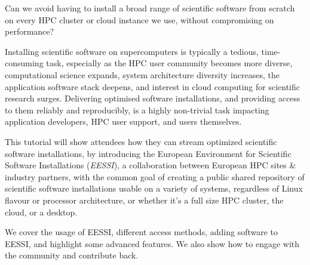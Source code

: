 Can we avoid having to install a broad range of scientific software from scratch on every HPC cluster or
cloud instance we use, without compromising on performance?

Installing scientific software on supercomputers is typically a tedious, time-consuming task, especially as the
HPC user community becomes more diverse, computational science expands, system architecture diversity increases, the
application software stack deepens, and interest in cloud computing for scientific research surges.
Delivering optimised software installations, and providing access to them reliably and reproducibly,
is a highly non-trivial task impacting application developers, HPC user support, and users themselves.

This tutorial will show attendees how they can stream optimized scientific software installations,
by introducing the European Environment for Scientific Software Installations (\emph{EESSI}), a collaboration
between European HPC sites \& industry partners, with the common goal of creating a public shared repository of scientific
software installations usable on a variety of systems, regardless of Linux flavour or processor architecture, or
whether it's a full size HPC cluster, the cloud, or a desktop.

We cover the usage of EESSI, different access methods, adding software to EESSI, and highlight some advanced features.
We also show how to engage with the community and contribute back.

